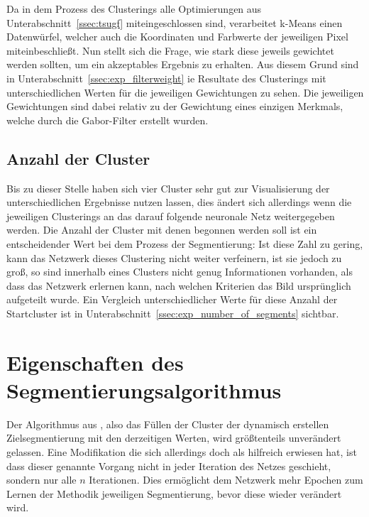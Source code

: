 Da in dem Prozess des Clusterings alle Optimierungen aus Unterabschnitt~\ref{ssec:tsugf} miteingeschlossen sind, verarbeitet k-Means einen Datenwürfel, welcher auch die Koordinaten und Farbwerte der jeweiligen Pixel miteinbeschließt. Nun stellt sich die Frage, wie stark diese jeweils gewichtet werden sollten, um ein akzeptables Ergebnis zu erhalten. Aus diesem Grund sind in Unterabschnitt~\ref{ssec:exp_filterweight} ie Resultate des Clusterings mit unterschiedlichen Werten für die jeweiligen Gewichtungen zu sehen. Die jeweiligen Gewichtungen sind dabei relativ zu der Gewichtung eines einzigen Merkmals, welche durch die Gabor-Filter erstellt wurden.

\subsection{Anzahl der Cluster}
\label{ssec:initialization_number_of_segments}

Bis zu dieser Stelle haben sich vier Cluster sehr gut zur Visualisierung der unterschiedlichen Ergebnisse nutzen lassen, dies ändert sich allerdings wenn die jeweiligen Clusterings an das darauf folgende neuronale Netz weitergegeben werden. Die Anzahl der Cluster mit denen begonnen werden soll ist ein entscheidender Wert bei dem Prozess der Segmentierung: Ist diese Zahl zu gering, kann das Netzwerk dieses Clustering nicht weiter verfeinern, ist sie jedoch zu groß, so sind innerhalb eines Clusters nicht genug Informationen vorhanden, als dass das Netzwerk erlernen kann, nach welchen Kriterien das Bild ursprünglich aufgeteilt wurde. Ein Vergleich unterschiedlicher Werte für diese Anzahl der Startcluster ist in Unterabschnitt~\ref{ssec:exp_number_of_segments} sichtbar.

\section{Eigenschaften des Segmentierungsalgorithmus}
\label{sec:algorithm}

Der Algorithmus aus \cite{kanezaki_18}, also das Füllen der Cluster der dynamisch erstellen Zielsegmentierung mit den derzeitigen Werten, wird größtenteils unverändert gelassen. Eine Modifikation die sich allerdings doch als hilfreich erwiesen hat, ist dass dieser genannte Vorgang nicht in jeder Iteration des Netzes geschieht, sondern nur alle $n$ Iterationen. Dies ermöglicht dem Netzwerk mehr Epochen zum Lernen der Methodik jeweiligen Segmentierung, bevor diese wieder verändert wird.

